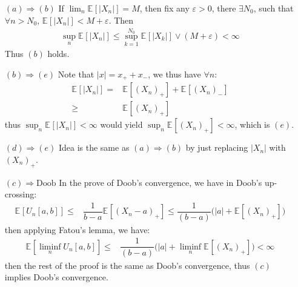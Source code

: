 \documentclass[11pt,a4paper]{ctexart}
\numberwithin{equation}{section}%
\begin{document}
\begin{enumerate}[topsep=2pt,itemsep=2pt]
    \item[$ (a) \Rightarrow (b) $] If $ \lim_n \mathbb{E}_{  }\left[ \left\vert X_n \right\vert  \right] =M $, then fix any $ \varepsilon >0 $, there  $ \exists N_0$, such that $ \forall n > N_0 $, $ \mathbb{E}_{  }\left[ \left\vert X_n \right\vert  \right] < M + \varepsilon $. Then 
    \begin{align*}
        \sup_n \mathbb{E}_{  }\left[ \left\vert X_n \right\vert  \right]\leq \sup_{k=1}^{N_0} \mathbb{E}_{  }\left[ \left\vert X_k \right\vert  \right] \vee (M+\varepsilon) < \infty 
    \end{align*}
    Thus $ (b) $ holds.
    \item[$ (b) \Rightarrow (e) $] Note that $ \left\vert x \right\vert =x_+ + x_- $, we thus have $ \forall n $:
    \begin{align*}
         \mathbb{E}_{  }\left[ \left\vert X_n \right\vert  \right] =& \mathbb{E}_{  }\left[ (X_n)_+ \right]  + \mathbb{E}_{  }\left[ (X_n)_- \right] \\
         \geq& \mathbb{E}_{  }\left[ (X_n)_+ \right] 
    \end{align*}
    thus $ \sup_n \mathbb{E}_{  }\left[ \left\vert X_n \right\vert  \right]< \infty $ would yield $ \sup_n \mathbb{E}_{  }\left[ (X_n)_+ \right] < \infty $, which is $ (e) $.
    \item[$ (d) \Rightarrow (e) $] Idea is the same as $ (a) \Rightarrow (b) $ by just replacing $ \left\vert X_n \right\vert $ with $ (X_n)_+ $.
    \item[$ (c) \Rightarrow \text{Doob} $] In the prove of Doob's convergence, we have in Doob's up-crossing:
    \begin{align*}
        \mathbb{E}_{  }\left[ U_n[a,b] \right] \leq& \dfrac{ 1 }{ b-a }\mathbb{E}_{  }\left[ (X_n-a)_+ \right] \leq \dfrac{ 1 }{ (b-a) }\big(\left\vert a \right\vert + \mathbb{E}_{  }\left[ (X_n)_+ \right] \big)    
    \end{align*}
    then applying Fatou's lemma, we have:
    \begin{align*}
        \mathbb{E}_{  }\left[ \liminf_n U_n[a,b] \right] \leq& \dfrac{ 1 }{ (b-a) }\big(\left\vert a \right\vert + \liminf_n \mathbb{E}_{  }\left[ (X_n)_+ \right] \big) < \infty
    \end{align*}
    then the rest of the proof is the same as Doob's convergence, thus $ (c) $ implies Doob's convergence.
\end{enumerate}
\end{document}
